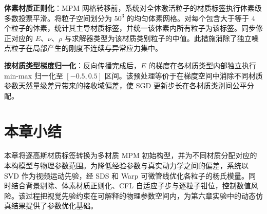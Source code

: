 \textbf{体素材质正则化}：MPM 网格转移前，系统对全体激活粒子的材质标签执行体素级多数投票平滑。将粒子空间划分为 $50^3$ 的均匀体素网格。对每个包含大于等于 $4$ 个粒子的体素，统计其主导材质标签，并统一该体素内所有粒子为该标签。同步修正对应的 $E$、$\nu$、$\rho$ 与求解器类型为该材质类别粒子的中值。此措施消除了独立噪点粒子在局部产生的刚度不连续与异常应力集中。

\textbf{按材质类型梯度归一化}：反向传播完成后，$E$ 的梯度在各材质类型内部独立执行 min-max 归一化至 $[-0.5, 0.5]$ 区间。该预处理等价于在梯度空间中消除不同材质参数天然量级差异带来的接收域偏差，使 SGD 更新步长在各材质类别间公平分配。


\section{本章小结}
本章将逐高斯材质标签转换为多材质 MPM 初始构型，并为不同材质分配对应的本构模型与物理参数范围。为降低经验参数与真实动力学之间的偏差，系统以 SVD 作为视频运动先验，经 SDS 和 Warp 可微管线优化各粒子的杨氏模量。同时结合背景剔除、体素材质正则化、CFL 自适应子步与逐粒子钳位，控制数值风险。该过程把视觉先验约束在可解释的物理参数空间内，为第六章实验中的动态仿真结果提供了参数优化基础。
